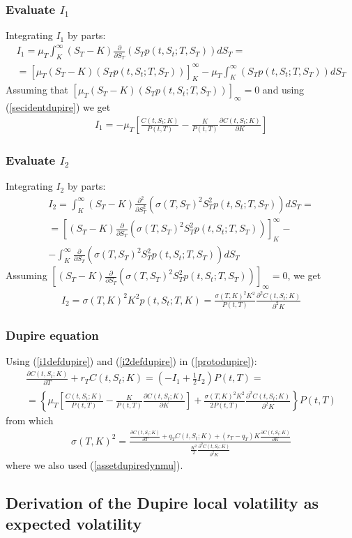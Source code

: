 \documentclass[a4paper,10pt]{report}
\theoremstyle{plain}
\theoremstyle{definition}
\newcommand\be{\begin{eqnarray}}    %
\newcommand\ee{\end{eqnarray}}
\begin{document}
\subsubsection{Evaluate $I_1$}
Integrating $I_1$ by parts:
\be 
I_1= \mu_T \int_K^\infty (S_T-K) \frac{\partial }{\partial S_T}\left(S_T p(t,S_t;T,S_T)\right)dS_T=\\
=\left[\mu_T(S_T-K)\left(S_T p(t,S_t;T,S_T)\right)\right]_K^\infty -\mu_T \int_K^\infty \left(S_T p(t,S_t;T,S_T)\right)dS_T
\ee
Assuming that $\left[\mu_T(S_T-K)\left(S_T p(t,S_t;T,S_T)\right)\right]_\infty = 0$ and using (\ref{secidentdupire}) we get
\be 
\label{i1defdupire}
I_1=-\mu_T\left[\frac{C(t,S_t;K)}{P(t,T)} -\frac{K}{P(t,T)}\frac{\partial C(t,S_t;K)}{\partial K}\right]
\ee 
\subsubsection{Evaluate $I_2$}
Integrating $I_2$ by parts:
\be 
I_2=\int_K^\infty (S_T-K) \frac{\partial^2 }{\partial S_T^2}\left(\sigma(T,S_T)^2S_T^2 p(t,S_t;T,S_T)\right) dS_T=\\
=\left[(S_T-K) \frac{\partial }{\partial S_T}\left(\sigma(T,S_T)^2S_T^2 p(t,S_t;T,S_T)\right)\right]_K^\infty-\\
-\int_K^\infty  \frac{\partial }{\partial S_T}\left(\sigma(T,S_T)^2S_T^2 p(t,S_t;T,S_T)\right) dS_T
\ee
Assuming $\left[(S_T-K) \frac{\partial }{\partial S_T}\left(\sigma(T,S_T)^2S_T^2 p(t,S_t;T,S_T)\right)\right]_\infty=0$, we get
\be 
\label{i2defdupire}
I_2=\sigma(T,K)^2 K^2 p(t,S_t;T,K)= \frac{\sigma(T,K)^2 K^2}{P(t,T)}\frac{\partial^2 C(t,S_t;K)}{\partial^2 K}
\ee
\subsubsection{Dupire equation}
Using (\ref{i1defdupire}) and (\ref{i2defdupire}) in (\ref{protodupire}):
\be
\frac{\partial C(t,S_t;K)}{\partial T}+r_T C(t,S_t;K)=\left(-I_1+\frac{1}{2}I_2\right)P(t,T)=\\
=\left\{  \mu_T\left[\frac{C(t,S_t;K)}{P(t,T)} -\frac{K}{P(t,T)}\frac{\partial C(t,S_t;K)}{\partial K}\right]  +\frac{\sigma(T,K)^2 K^2}{2 P(t,T)}\frac{\partial^2 C(t,S_t;K)}{\partial^2 K} \right\}P(t,T)
\ee
from which
\be 
\label{finaldupireeq}
\sigma(T,K)^2 = \frac{\frac{\partial C(t,S_t;K)}{\partial T}+q_T C(t,S_t;K)+(r_T-q_T) K\frac{\partial C(t,S_t;K)}{\partial K}}{\frac{ K^2}{2}\frac{\partial^2 C(t,S_t;K)}{\partial^2 K}}
\ee
where we also used (\ref{assetdupiredynmu}).

\subsection{Derivation of the Dupire local volatility as expected volatility}
\end{document}
